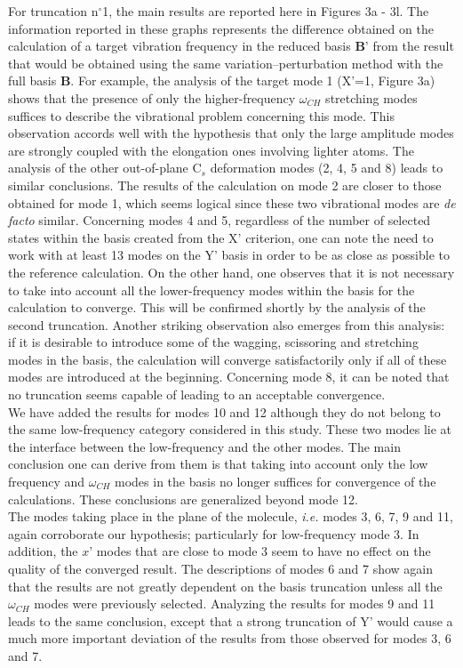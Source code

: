 	For truncation n$^{\circ}$1, the main results are reported here in Figures 3a - 3l. The information reported in these graphs represents the difference obtained on the calculation of a target vibration frequency in the reduced basis $\textbf{B’}$ from the result that would be obtained using the same variation–perturbation method with the full basis $\textbf{B}$. For example, the analysis of the target mode 1 (X’=1, Figure 3a) shows that the presence of only the higher-frequency $\omega_{CH}$ stretching modes suffices to describe the vibrational problem concerning this mode. This observation accords well with the hypothesis that only the large amplitude modes are strongly coupled with the elongation ones involving lighter atoms. The analysis of the other out-of-plane C$_{s}$ deformation modes (2, 4, 5 and 8) leads to similar conclusions. The results of the calculation on mode 2 are closer to those obtained for mode 1, which seems logical since these two vibrational modes are \textit{de facto} similar. Concerning modes 4 and 5, regardless of the number of selected states within the basis created from the X’ criterion, one can note the need to work with at least 13 modes on the Y’ basis in order to be as close as possible to the reference calculation. On the other hand, one observes that it is not necessary to take into account all the lower-frequency modes within the basis for the calculation to converge. This will be confirmed shortly by the analysis of the second truncation. Another striking observation also emerges from this analysis: if it is desirable to introduce some of the wagging, scissoring and stretching modes in the basis, the calculation will converge satisfactorily only if all of these modes are introduced at the beginning. Concerning mode 8, it can be noted that no truncation seems capable of leading to an acceptable convergence.\\
	
	We have added the results for modes 10 and 12 although they do not belong to the same low-frequency category considered in this study. These two modes lie at the interface between the low-frequency and the other modes. The main conclusion one can derive from them is that taking into account only the low frequency and $\omega_{CH}$ modes in the basis no longer suffices for convergence of the calculations. These conclusions are generalized beyond mode 12.\\
	
	The modes taking place in the plane of the molecule, \textit{i.e.} modes 3, 6, 7, 9 and 11, again corroborate our hypothesis; particularly for low-frequency mode 3. In addition, the $x’$ modes that are close to mode 3 seem to have no effect on the quality of the converged result. The descriptions of modes 6 and 7 show again that the results are not greatly dependent on the basis truncation unless all the $\omega_{CH}$ modes were previously selected. Analyzing the results for modes 9 and 11 leads to the same conclusion, except that a strong truncation of Y’ would cause a much more important deviation of the results from those observed for modes 3, 6 and 7.\\
	
